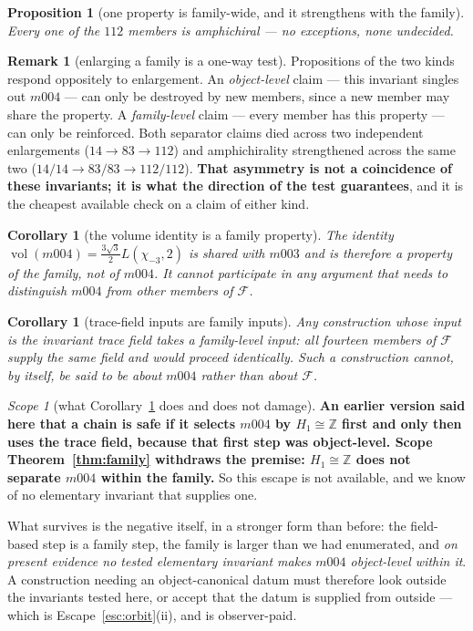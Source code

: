 \documentclass[11pt,a4paper]{article}
\newtheorem{proposition}[theorem]{Proposition}
\newtheorem{corollary}[theorem]{Corollary}
\theoremstyle{definition}
\newtheorem{remark}[theorem]{Remark}
\theoremstyle{remark}
\newtheorem{scope}[theorem]{Scope}
\newcommand{\Z}{\mathbb{Z}}
\newcommand{\vol}{\operatorname{vol}}
\begin{document}
\begin{proposition}[one property is family-wide, and it strengthens with the family]\label{prop:amph}
Every one of the $112$ members is amphichiral --- no exceptions, none undecided.
\end{proposition}

\begin{remark}[enlarging a family is a one-way test]\label{rem:oneway}
Propositions of the two kinds respond oppositely to enlargement. An \emph{object-level} claim ---
this invariant singles out $m004$ --- can only be destroyed by new members, since a new member may
share the property. A \emph{family-level} claim --- every member has this property --- can only be
reinforced. Both separator claims died across two independent enlargements ($14\to83\to112$) and
amphichirality strengthened across the same two ($14/14\to83/83\to112/112$). \textbf{That asymmetry
is not a coincidence of these invariants; it is what the direction of the test guarantees}, and it
is the cheapest available check on a claim of either kind.
\end{remark}

\begin{corollary}[the volume identity is a family property]\label{cor:volume}
The identity $\vol(m004)=\tfrac{3\sqrt3}{2}L(\chi_{-3},2)$ is shared with $m003$ and is therefore
a property of the family, not of $m004$. It cannot participate in any argument that needs to
distinguish $m004$ from other members of $\mathcal{F}$.
\end{corollary}

\begin{corollary}[trace-field inputs are family inputs]\label{cor:familyinput}
Any construction whose input is the invariant trace field takes a family-level input: all fourteen
members of $\mathcal{F}$ supply the same field and would proceed identically. Such a construction
cannot, by itself, be said to be about $m004$ rather than about $\mathcal{F}$.
\end{corollary}

\begin{scope}[what Corollary~\ref{cor:familyinput} does and does not damage]\label{sc:notdamaging}
\textbf{An earlier version said here that a chain is safe if it selects $m004$ by $H_1\cong\Z$
first and only then uses the trace field, because that first step was object-level. Scope
Theorem~\ref{thm:family} withdraws the premise: $H_1\cong\Z$ does not separate $m004$
within the family.} So this escape is not available, and we know of no elementary invariant that supplies
one.

What survives is the negative itself, in a stronger form than before: the field-based step is a
family step, the family is larger than we had enumerated, and \emph{on present evidence no tested
elementary invariant makes $m004$ object-level within it}. A construction needing an
object-canonical datum must therefore look outside the invariants tested here, or accept that the
datum is supplied from outside --- which is Escape~\ref{esc:orbit}(ii), and is observer-paid.
\end{scope}
\end{document}
